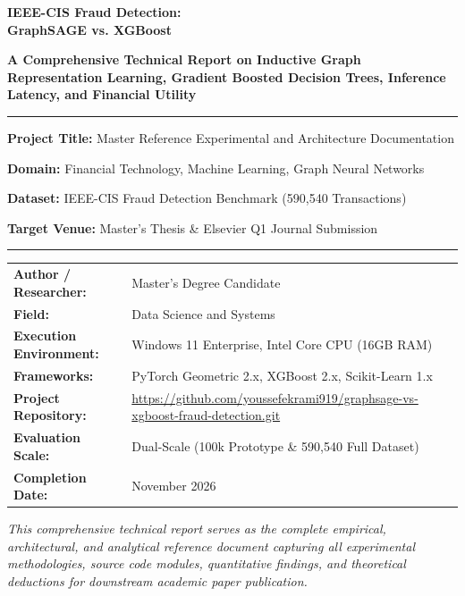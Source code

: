 \documentclass[11pt,a4paper]{report}
\begin{document}
\begin{titlepage}
    \centering
    \vspace*{1.5cm}
    
    {\Huge \bfseries \color{navyblue} IEEE-CIS Fraud Detection:\\[0.3em] GraphSAGE vs. XGBoost\par}
    \vspace{1cm}
    {\LARGE \textbf{A Comprehensive Technical Report on Inductive Graph Representation Learning, Gradient Boosted Decision Trees, Inference Latency, and Financial Utility}\par}
    
    \vspace{1.5cm}
    \rule{\linewidth}{1.5pt}\par
    \vspace{0.8cm}
    
    {\large \textbf{Project Title:} Master Reference Experimental and Architecture Documentation\par}
    {\large \textbf{Domain:} Financial Technology, Machine Learning, Graph Neural Networks\par}
    {\large \textbf{Dataset:} IEEE-CIS Fraud Detection Benchmark (590,540 Transactions)\par}
    {\large \textbf{Target Venue:} Master's Thesis \& Elsevier Q1 Journal Submission\par}
    
    \vspace{0.8cm}
    \rule{\linewidth}{1.5pt}\par
    
    \vspace{1.5cm}
    \begin{tabular}{ll}
        \textbf{Author / Researcher:} & Master's Degree Candidate \\
        \textbf{Field:} & Data Science and Systems \\
        \textbf{Execution Environment:} & Windows 11 Enterprise, Intel Core CPU (16GB RAM) \\
        \textbf{Frameworks:} & PyTorch Geometric 2.x, XGBoost 2.x, Scikit-Learn 1.x \\
        \textbf{Project Repository:} & \url{https://github.com/youssefekrami919/graphsage-vs-xgboost-fraud-detection.git} \\
        \textbf{Evaluation Scale:} & Dual-Scale (100k Prototype \& 590,540 Full Dataset) \\
        \textbf{Completion Date:} & November 2026 \\
    \end{tabular}
    
    \vfill
    {\small \textit{This comprehensive technical report serves as the complete empirical, architectural, and analytical reference document capturing all experimental methodologies, source code modules, quantitative findings, and theoretical deductions for downstream academic paper publication.}\par}
\end{titlepage}
\end{document}
